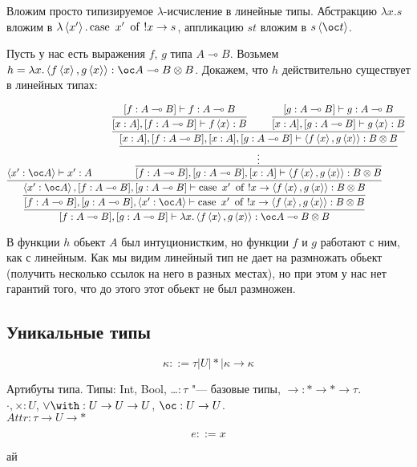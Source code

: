 Вложим просто типизируемое $\lambda$-исчисление в линейные типы.
Абстракцию $\lambda x.s$ вложим в $\lambda\left<x'\right>.\mathinner{\mathrm{case}}~x'~\mathinner{\mathrm{of}}~!x \rightarrow s$,
аппликацию $st$ вложим в $s\pair{\oc t}$.

\begin{example}
	Пусть у нас есть выражения $f$, $g$  типа $A \multimap B$.
	Возьмем $h = \lambda x.\pair{f\pair{x}, g\pair{x}} : \oc A \multimap B \otimes B$.
	Докажем, что $h$ действительно существует в линейных типах:

	\[
		\infer[]{[f : A \multimap B], [g : A\multimap B]\vdash \lambda x.\pair{f\pair{x}, g\pair{x}} : \oc A \multimap B \otimes B}{
			\infer[]{
				[f : A \multimap B], [g : A \multimap B], \pair{x' : \oc A}
				\vdash \caseb{x'}{!x \rightarrow \pair{f\pair{x}, g\pair{x}} : B \otimes B}
			}{
				\infer[]{
					\pair{x' : \oc A}, [f : A \multimap B], [g : A \multimap B]
				\vdash \caseb{x'}{!x \rightarrow \pair{f\pair{x}, g\pair{x}} : B \otimes B}
				}{
					\pair{x' : \oc A} \vdash x' : A &&
					\infer[]{[f : A \multimap B], [g : A \multimap B], [x : A]\vdash \pair{f\pair{x}, g\pair{x}} : B \otimes B}{
						\infer[]{\vdots}{
						\infer[]{[x : A], [f : A \multimap B], [x : A], [g : A \multimap B]\vdash \pair{f\pair{x}, g\pair{x}} : B \otimes B}{
								\infer[]{[x : A], [f : A \multimap B]\vdash f\pair{x} : B}{[f : A \multimap B] \vdash f : A \multimap B}
								&&
								\infer[]{[x : A], [g : A \multimap B]\vdash g\pair{x} : B}{[g : A \multimap B] \vdash g : A \multimap B}
							}
						}
					}
				}
			}
		}
	\]

	В функции $h$ обьект $A$ был интуционистким, но функции $f$ и $g$ работают с ним, как с линейным.
	Как мы видим линейный тип не дает на размножать обьект (получить несколько ссылок на него в разных местах),
	но при этом у нас нет гарантий того, что до этого этот обьект не был размножен.
\end{example}

\subsection{\texorpdfstring{Уникальные типы}{Unique types}}

\begin{bnf}
\[
    \kappa ::= \tau | U | * | \kappa \rightarrow \kappa
\]
\end{bnf}

Артибуты типа.
Типы: Int, Bool, \ldots $: \tau$ "--- базовые типы, $\rightarrow : * \rightarrow * \rightarrow \tau$. \\
$\cdot, \times : U$, $\vee \with : U \rightarrow U \rightarrow U$, $\oc : U \rightarrow U$. \\
$Attr : \tau \rightarrow U \rightarrow *$

\begin{bnf}
\[
    e ::= x
\]
\end{bnf}

ай
